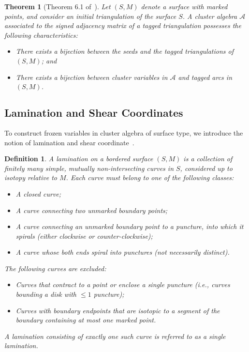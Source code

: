 \documentclass{article}
\newtheorem{definition}{Definition}
\newtheorem{theorem}{Theorem}
\theoremstyle{remark}
\begin{document}
\begin{theorem}[Theorem 6.1 of~\cite{FT-II}]
Let $(S, M)$ denote a surface with marked points, and consider an initial triangulation of the surface $S$. A cluster algebra $\mathcal{A}$ associated to the signed adjacency matrix of a tagged triangulation possesses the following characteristics:
\begin{itemize}
    \item There exists a bijection between the seeds and the tagged triangulations of $(S, M)$; and
    \item There exists a bijection between cluster variables in $\mathcal{A}$ and tagged arcs in $(S, M)$.
\end{itemize}
\end{theorem}
\subsection{Lamination and Shear Coordinates}
To construct frozen variables in cluster algebra of surface type, we introduce the notion of lamination and shear coordinate~\cite{Fock2007,FT-II}. 

\begin{definition}
A \emph{lamination} on a bordered surface $(S, M)$ is a collection of finitely many simple, mutually non-intersecting curves in $S$, considered up to isotopy relative to $M$. Each curve must belong to one of the following classes:
\begin{itemize}
    \item A closed curve;
    \item A curve connecting two unmarked boundary points;
    \item A curve connecting an unmarked boundary point to a puncture, into which it spirals (either clockwise or counter-clockwise);
    \item A curve whose both ends spiral into punctures (not necessarily distinct).
\end{itemize}
The following curves are excluded:
\begin{itemize}
    \item Curves that contract to a point or enclose a single puncture (i.e., curves bounding a disk with $\le 1$ puncture);
    \item Curves with boundary endpoints that are isotopic to a segment of the boundary containing at most one marked point.
\end{itemize}
A lamination consisting of exactly one such curve is referred to as a \emph{single lamination}.
\end{definition}
\end{document}
